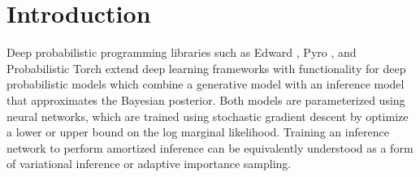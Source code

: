 \documentclass{article}
\theoremstyle{definition}
\begin{document}
\begin{abstract}







\end{abstract}

\section{Introduction}

\label{introduction}

Deep probabilistic programming libraries such as Edward \cite{tran2016edward}, Pyro \cite{bingham2018pyro}, and Probabilistic Torch \cite{siddharth2017learning}  extend deep learning frameworks with functionality for deep probabilistic models which combine a generative model with an inference model that approximates the Bayesian posterior.
Both models are parameterized using neural networks, which are trained using stochastic gradient descent by optimize a lower or upper bound on the log marginal likelihood. Training an inference network to perform amortized inference can be equivalently understood as a form of variational inference or adaptive importance sampling.
\end{document}
